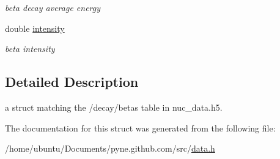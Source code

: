 \begin{DoxyCompactItemize}
\begin{DoxyCompactList}\small\item\em beta decay average energy \end{DoxyCompactList}\item 
double \hyperlink{structpyne_1_1beta_a9c2cd5b0d491324940bdd68bde23113a}{intensity}\hypertarget{structpyne_1_1beta_a9c2cd5b0d491324940bdd68bde23113a}{}\label{structpyne_1_1beta_a9c2cd5b0d491324940bdd68bde23113a}

\begin{DoxyCompactList}\small\item\em beta intensity \end{DoxyCompactList}\end{DoxyCompactItemize}


\subsection{Detailed Description}
a struct matching the \textquotesingle{}/decay/betas\textquotesingle{} table in nuc\+\_\+data.\+h5. 

The documentation for this struct was generated from the following file\+:\begin{DoxyCompactItemize}
\item 
/home/ubuntu/\+Documents/pyne.\+github.\+com/src/\hyperlink{data_8h}{data.\+h}\end{DoxyCompactItemize}
